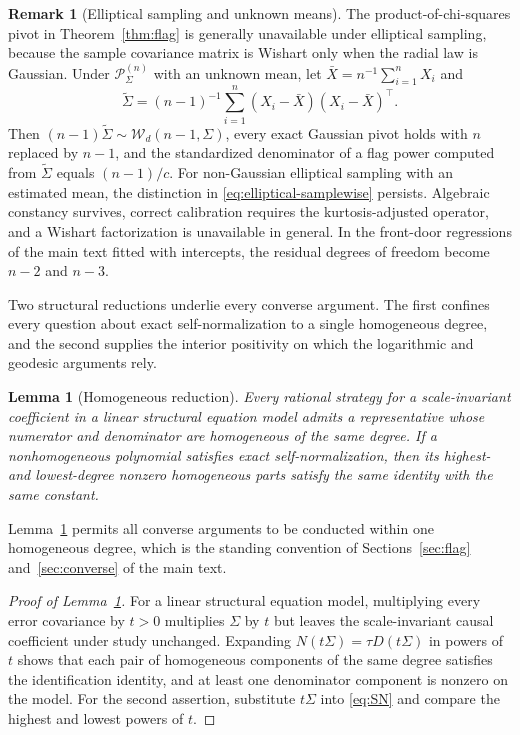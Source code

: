\documentclass[12pt,a4paper]{article}
\theoremstyle{plain}
\newtheorem{lemma}{Lemma}
\theoremstyle{definition}
\newtheorem{remark}{Remark}
\begin{document}
\begin{remark}[Elliptical sampling and unknown means]
\label{rem:elliptical-unknown-mean}
    The product-of-chi-squares pivot in Theorem~\ref{thm:flag} is generally unavailable under elliptical sampling, because the sample covariance matrix is Wishart only when the radial law is Gaussian.
    Under $\mathcal{P}_\Sigma^{(n)}$ with an unknown mean, let $\bar{X}=n^{-1}\sum_{i=1}^nX_i$ and
    \begin{equation*}
        \tilde{\Sigma}
        =
        (n-1)^{-1}\sum_{i=1}^n(X_i-\bar{X})(X_i-\bar{X})^\top
        .
    \end{equation*}
    Then $(n-1)\tilde{\Sigma}\sim\mathcal{W}_d(n-1,\Sigma)$, every exact Gaussian pivot holds with $n$ replaced by $n-1$, and the standardized denominator of a flag power computed from $\tilde{\Sigma}$ equals $(n-1)/c$.
    For non-Gaussian elliptical sampling with an estimated mean, the distinction in \eqref{eq:elliptical-samplewise} persists.
    Algebraic constancy survives, correct calibration requires the kurtosis-adjusted operator, and a Wishart factorization is unavailable in general.
    In the front-door regressions of the main text fitted with intercepts, the residual degrees of freedom become $n-2$ and $n-3$.
\end{remark}

Two structural reductions underlie every converse argument.
The first confines every question about exact self-normalization to a single homogeneous degree, and the second supplies the interior positivity on which the logarithmic and geodesic arguments rely.

\begin{lemma}[Homogeneous reduction]
\label{lem:homog-main}
    Every rational strategy for a scale-invariant coefficient in a linear structural equation model admits a representative whose numerator and denominator are homogeneous of the same degree.
    If a nonhomogeneous polynomial satisfies exact self-normalization, then its highest- and lowest-degree nonzero homogeneous parts satisfy the same identity with the same constant.
\end{lemma}

Lemma~\ref{lem:homog-main} permits all converse arguments to be conducted within one homogeneous degree, which is the standing convention of Sections~\ref{sec:flag} and~\ref{sec:converse} of the main text.

\begin{proof}[Proof of Lemma~\ref{lem:homog-main}]
    For a linear structural equation model, multiplying every error covariance by $t>0$ multiplies $\Sigma$ by $t$ but leaves the scale-invariant causal coefficient under study unchanged.
    Expanding $N(t\Sigma)=\tau D(t\Sigma)$ in powers of $t$ shows that each pair of homogeneous components of the same degree satisfies the identification identity, and at least one denominator component is nonzero on the model.
    For the second assertion, substitute $t\Sigma$ into \eqref{eq:SN} and compare the highest and lowest powers of $t$.
\end{proof}
\end{document}

